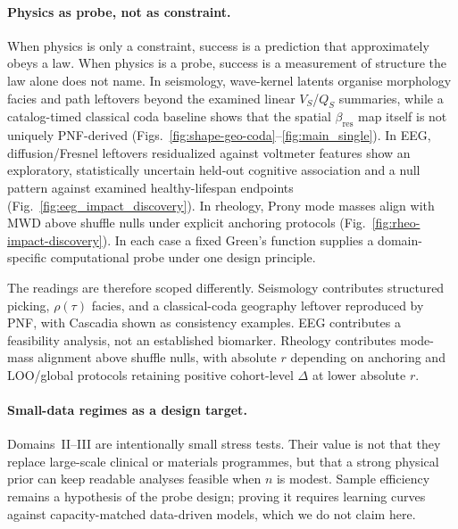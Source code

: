 \documentclass[twocolumn, 10pt]{article}
\begin{document}
\paragraph{Physics as probe, not as constraint.}
When physics is only a constraint, success is a prediction that approximately obeys a law. When physics is a probe, success is a measurement of structure the law alone does not name. In seismology, wave-kernel latents organise morphology facies and path leftovers beyond the examined linear \(V_S\)/\(Q_S\) summaries, while a catalog-timed classical coda baseline shows that the spatial \(\beta_{\mathrm{res}}\) map itself is not uniquely PNF-derived (Figs.~\ref{fig:shape-geo-coda}--\ref{fig:main_single})\cite{aki1969,aki1975,lin2023}. In EEG, diffusion/Fresnel leftovers residualized against voltmeter features show an exploratory, statistically uncertain held-out cognitive association and a null pattern against examined healthy-lifespan endpoints (Fig.~\ref{fig:eeg_impact_discovery})\cite{tripanpitak2026,sohrabpour2025}. In rheology, Prony mode masses align with MWD above shuffle nulls under explicit anchoring protocols (Fig.~\ref{fig:rheo-impact-discovery})\cite{doi1986,degennes1971}. In each case a fixed Green's function supplies a domain-specific computational probe under one design principle.

The readings are therefore scoped differently. Seismology contributes structured picking, \(\rho(\tau)\) facies, and a classical-coda geography leftover reproduced by PNF, with Cascadia shown as consistency examples\cite{lin2023,delpezzo2023,herraiz2023}. EEG contributes a feasibility analysis, not an established biomarker\cite{jeong2004,sohrabpour2025,casas2025}. Rheology contributes mode-mass alignment above shuffle nulls, with absolute \(r\) depending on anchoring and LOO/global protocols retaining positive cohort-level \(\Delta\) at lower absolute \(r\)\cite{doi1986,elliott2025,winey2019}.

\paragraph{Small-data regimes as a design target.}
Domains~II--III are intentionally small stress tests. Their value is not that they replace large-scale clinical or materials programmes, but that a strong physical prior can keep readable analyses feasible when \(n\) is modest\cite{zhai2025,lu2025,sharma2025}. Sample efficiency remains a hypothesis of the probe design; proving it requires learning curves against capacity-matched data-driven models, which we do not claim here.
\end{document}
